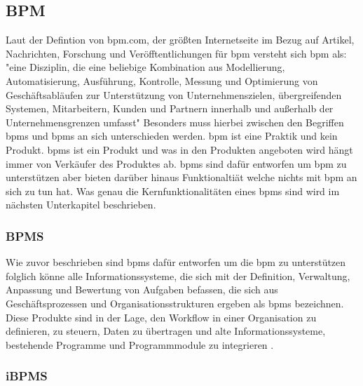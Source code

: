 \documentclass[a4paper, 12pt, twoside, headsepline=true]{scrartcl} %
\begin{document}
\subsection{BPM}
Laut der Defintion von bpm.com, der größten Internetseite im Bezug auf Artikel, Nachrichten, Forschung und Veröfftentlichungen für \ac{bpm} \cite{aboutbpmcom} versteht sich \ac{bpm} als: "eine Disziplin, die eine beliebige Kombination aus Modellierung, Automatisierung, Ausführung, Kontrolle, Messung und Optimierung von Geschäftsabläufen zur Unterstützung von Unternehmenszielen, übergreifenden Systemen, Mitarbeitern, Kunden und Partnern innerhalb und außerhalb der Unternehmensgrenzen umfasst"\cite{whatisbpm}
Besonders muss hierbei zwischen den Begriffen \ac{bpms} und \ac{bpms} an sich unterschieden werden. \ac{bpm} ist eine Praktik und kein Produkt. \ac{bpms} ist ein Produkt und was in den Produkten angeboten wird hängt immer von Verkäufer des Produktes ab. \ac{bpms} sind dafür entworfen um \ac{bpm} zu unterstützen aber bieten darüber hinaus Funktionaltiät welche nichts mit \ac{bpm} an sich zu tun hat. Was genau die Kernfunktionalitäten eines \ac{bpms} sind wird im nächsten Unterkapitel beschrieben.

\subsubsection{BPMS}

Wie zuvor beschrieben sind \ac{bpms} dafür entworfen um die \ac{bpm} zu unterstützen folglich könne alle Informationssysteme, die sich mit der Definition, Verwaltung, Anpassung und Bewertung von Aufgaben befassen, die sich aus Geschäftsprozessen und Organisationsstrukturen ergeben als \ac{bpms} bezeichnen. Diese Produkte sind in der Lage, den Workflow in einer Organisation zu definieren, zu steuern, Daten zu übertragen und alte Informationssysteme, bestehende Programme und Programmmodule zu integrieren \cite{bpms}.

\subsubsection{iBPMS}
\end{document}
